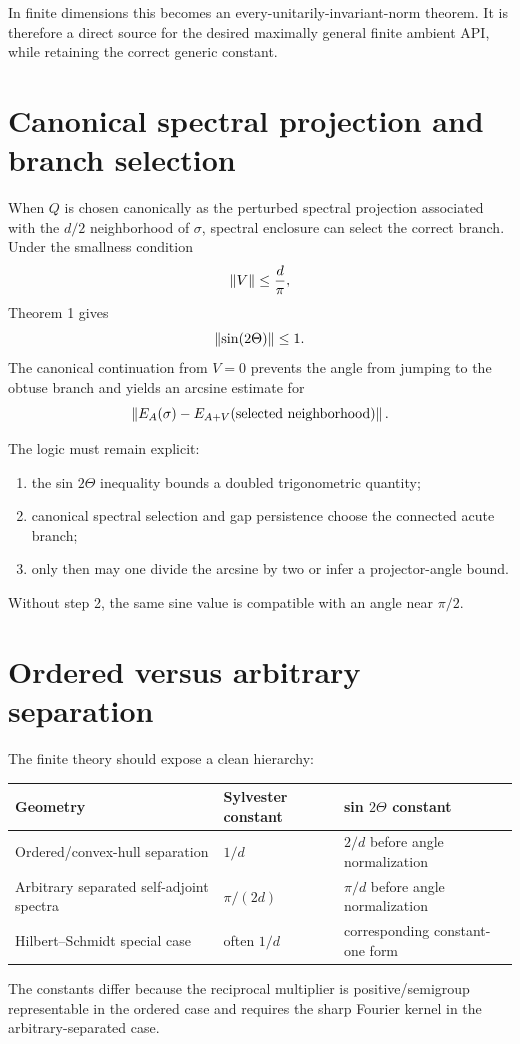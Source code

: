 In finite dimensions this becomes an every-unitarily-invariant-norm theorem. It is therefore a direct source for the desired maximally general finite ambient API, while retaining the correct generic constant.

\section{Canonical spectral projection and branch selection}

When $Q$ is chosen canonically as the perturbed spectral projection associated with the $d/2$ neighborhood of $\sigma$, spectral enclosure can select the correct branch. Under the smallness condition
\[
 \left\lVert V\right\rVert\le\frac d\pi,
\]
Theorem 1 gives
\[
 \left\lVert \sin(2\Theta)\right\rVert\le1.
\]
The canonical continuation from $V=0$ prevents the angle from jumping to the obtuse branch and yields an arcsine estimate for
\[
 \left\lVert E_A(\sigma)-E_{A+V}(\text{selected neighborhood})\right\rVert.
\]

The logic must remain explicit:
\begin{enumerate}[leftmargin=2em]
\item the sin $2\Theta$ inequality bounds a doubled trigonometric quantity;
\item canonical spectral selection and gap persistence choose the connected acute branch;
\item only then may one divide the arcsine by two or infer a projector-angle bound.
\end{enumerate}
Without step 2, the same sine value is compatible with an angle near $\pi/2$.

\section{Ordered versus arbitrary separation}

The finite theory should expose a clean hierarchy:
\begin{center}
\begin{tabular}{@{}lll@{}}
\toprule
Geometry & Sylvester constant & sin $2\Theta$ constant\\
\midrule
Ordered/convex-hull separation & $1/d$ & $2/d$ before angle normalization\\
Arbitrary separated self-adjoint spectra & $\pi/(2d)$ & $\pi/d$ before angle normalization\\
Hilbert--Schmidt special case & often $1/d$ & corresponding constant-one form\\
\bottomrule
\end{tabular}
\end{center}
The constants differ because the reciprocal multiplier is positive/semigroup representable in the ordered case and requires the sharp Fourier kernel in the arbitrary-separated case.

